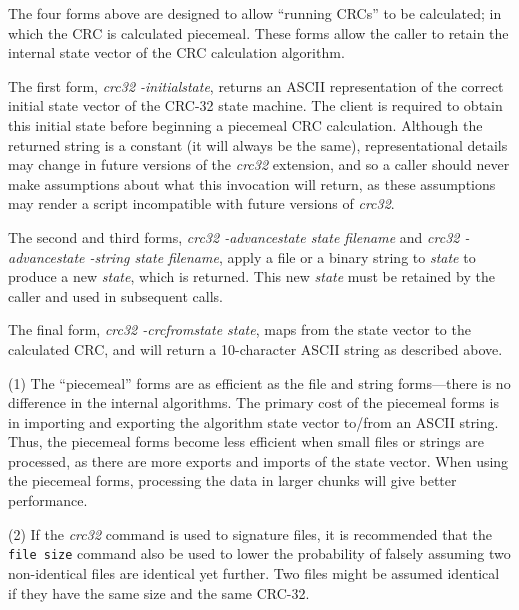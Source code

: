 \begin{tclcommanddescription}
\begin{tclcommandinternaldescription}
The four forms above are designed to allow ``running CRCs'' to be calculated; in which
the CRC is calculated piecemeal.  These forms allow the caller to retain the internal
state vector of the CRC calculation algorithm.

The first form, \emph{crc32 -initialstate}, returns an ASCII representation of the
correct initial state vector of the CRC-32 state machine.  The client is required
to obtain this initial state before beginning a piecemeal CRC calculation.  Although the
returned string is a constant (it will always be the same), representational details
may change in future versions of the \emph{crc32} extension, and so a caller should never
make assumptions about what this invocation will return, as these assumptions may
render a script incompatible with future versions of \emph{crc32}.

The second and third forms, \emph{crc32 -advancestate state filename}
and \emph{crc32 -advancestate -string state filename}, apply a file or a binary string
to \emph{state} to produce a new \emph{state}, which is returned.  This new \emph{state}
must be retained by the caller and used in subsequent calls.

The final form, \emph{crc32 -crcfromstate state}, maps from the state vector to the
calculated CRC, and will return a 10-character ASCII string as described above.
\end{tclcommandinternaldescription}
\end{tclcommanddescription}

\begin{tclcommandusagenotes}
(1) The ``piecemeal'' forms are as efficient as the file and string forms---there is no difference
in the internal algorithms.  The primary cost of the piecemeal forms is in importing and
exporting the algorithm state vector to/from an ASCII string.
Thus, the piecemeal forms become less efficient when
small files or strings are processed, as there are more exports and imports
of the state vector.  When using the piecemeal forms, processing the data in
larger chunks will give better performance.

(2) If the \emph{crc32} command is used to signature files, it is recommended that 
the \texttt{file size} command also be used to lower the probability of falsely
assuming two non-identical files are identical yet further.  Two files might be
assumed identical if they have the same size and the same CRC-32.
\end{tclcommandusagenotes}

